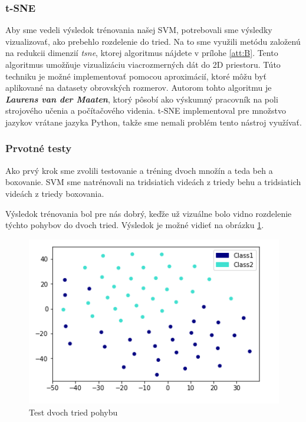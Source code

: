 \subsubsection{t-SNE}
Aby sme vedeli výsledok trénovania našej SVM, potrebovali sme výsledky vizualizovať, ako prebehlo rozdelenie do tried. Na to sme využili metódu založenú na redukcii dimenzií \textit{\acrfull{tsne}}, ktorej algoritmus nájdete v prílohe \ref{att:B}. Tento algoritmus umožňuje vizualizáciu viacrozmerných dát do 2D priestoru. Túto techniku je možné implementovať pomocou aproximácií, ktoré môžu byť aplikované na datasety obrovských rozmerov. Autorom tohto algoritmu je \textbf{\textit{Laurens van der Maaten}}, ktorý pôsobí ako výskumný pracovník na poli strojového učenia a počítačového videnia. t-SNE implementoval pre množstvo jazykov vrátane jazyka Python, takže sme nemali problém tento nástroj využívať. \cite{c18}



\subsubsection{Prvotné testy}
Ako prvý krok sme zvolili testovanie a tréning dvoch množín a teda beh a boxovanie. SVM sme natrénovali na tridsiatich videách z triedy behu a tridsiatich videách z triedy boxovania. 

Výsledok trénovania bol pre nás dobrý, keďže už vizuálne bolo vidno rozdelenie týchto pohybov do dvoch tried. Výsledok je možné vidieť na obrázku \ref{Test2Class}. 

\begin{figure}[H]
  \centering
  \includegraphics[width=14cm]{img/test2classes.png}
  \caption{Test dvoch tried pohybu}
  \label{Test2Class}
\end{figure} 


